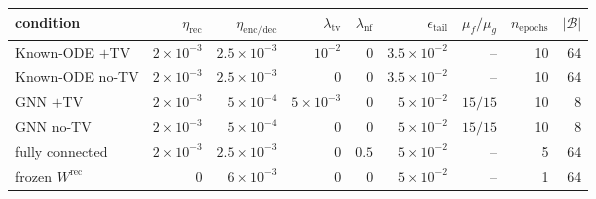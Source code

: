 \begin{tabular}{lrrrrrrrr}
\toprule
condition & $\eta_{\mathrm{rec}}$ & $\eta_{\mathrm{enc/dec}}$
  & $\lambda_{\mathrm{tv}}$ & $\lambda_{\mathrm{nf}}$ & $\epsilon_{\mathrm{tail}}$
  & $\mu_{f}/\mu_{g}$ & $n_{\mathrm{epochs}}$ & $|\mathcal B|$ \\
\midrule
Known-ODE $+$TV         & $2\!\times\!10^{-3}$ & $2.5\!\times\!10^{-3}$ & $10^{-2}$ & $0$    & $3.5\!\times\!10^{-2}$ & --              & 10 & 64 \\
Known-ODE no-TV         & $2\!\times\!10^{-3}$ & $2.5\!\times\!10^{-3}$ & $0$       & $0$    & $3.5\!\times\!10^{-2}$ & --              & 10 & 64 \\
GNN $+$TV               & $2\!\times\!10^{-3}$ & $5\!\times\!10^{-4}$   & $5\!\times\!10^{-3}$ & $0$ & $5\!\times\!10^{-2}$ & $15/15$ & 10 &  8 \\
GNN no-TV               & $2\!\times\!10^{-3}$ & $5\!\times\!10^{-4}$   & $0$       & $0$    & $5\!\times\!10^{-2}$ & $15/15$ & 10 &  8 \\
fully connected         & $2\!\times\!10^{-3}$ & $2.5\!\times\!10^{-3}$ & $0$       & $0.5$  & $5\!\times\!10^{-2}$ & --              &  5 & 64 \\
frozen $W^{\mathrm{rec}}$ & $0$                & $6\!\times\!10^{-3}$   & $0$       & $0$    & $5\!\times\!10^{-2}$ & --              &  1 & 64 \\
\bottomrule
\end{tabular}
